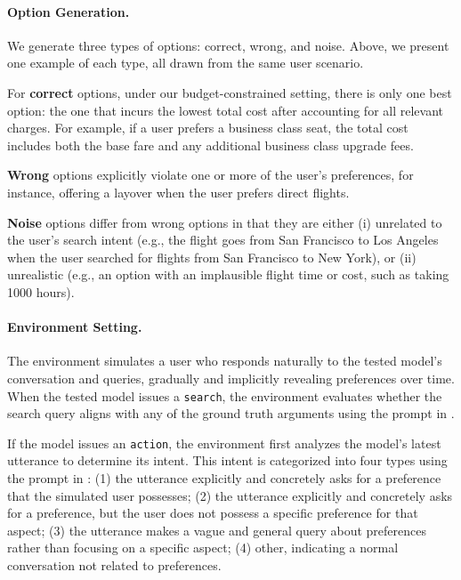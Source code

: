 \paragraph{Option Generation.}  
We generate three types of options: correct, wrong, and noise. Above, we present one example of each type, all drawn from the same user scenario.

For \textbf{correct} options, under our budget-constrained setting, there is only one best option: the one that incurs the lowest total cost after accounting for all relevant charges. For example, if a user prefers a business class seat, the total cost includes both the base fare and any additional business class upgrade fees.

\textbf{Wrong} options explicitly violate one or more of the user's preferences, for instance, offering a layover when the user prefers direct flights.

\textbf{Noise} options differ from wrong options in that they are either (i) unrelated to the user’s search intent (e.g., the flight goes from San Francisco to Los Angeles when the user searched for flights from San Francisco to New York), or (ii) unrealistic (e.g., an option with an implausible flight time or cost, such as taking 1000 hours).


\paragraph{Environment Setting.}
The environment simulates a user who responds naturally to the tested model's conversation and queries, gradually and implicitly revealing preferences over time. When the tested model issues a \texttt{search}, the environment evaluates whether the search query aligns with any of the ground truth arguments using the prompt in .

If the model issues an \texttt{action}, the environment first analyzes the model’s latest utterance to determine its intent. This intent is categorized into four types using the prompt in :  
(1) the utterance explicitly and concretely asks for a preference that the simulated user possesses;  
(2) the utterance explicitly and concretely asks for a preference, but the user does not possess a specific preference for that aspect;  
(3) the utterance makes a vague and general query about preferences rather than focusing on a specific aspect;  
(4) other, indicating a normal conversation not related to preferences.

